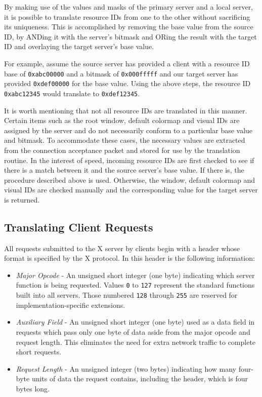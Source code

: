 By making use of the values and masks of the primary server and a local
server, it is possible to translate resource IDs from one to the other
without sacrificing its uniqueness.  This is accomplished by removing
the base value from the source ID, by ANDing it with the server's bitmask
and ORing the result with the target ID and overlaying the target
server's base value.

For example, assume the source server has provided a client with a
resource ID base of {\tt 0xabc00000} and a bitmask of {\tt 0x000fffff}
and our target server has provided  {\tt 0xdef00000} 
for the base value. Using the above steps,
the resource ID {\tt 0xabc12345} would translate to {\tt 0xdef12345}.

It is worth mentioning that not all resource IDs are translated in this
manner.  Certain items such as the root window, default colormap and
visual IDs are assigned by the server and do not necessarily conform to
a particular base value and bitmask.  To accommodate these cases, the
necessary values are extracted from the connection acceptance packet
and stored for use by the translation routine.  In the interest of
speed, incoming resource IDs are first checked to see if there is a
match between it and the source server's base value.  If there is, the
procedure described above is used.  Otherwise, the window, default
colormap and visual IDs are checked manually and the corresponding
value for the target server is returned.


\subsection{Translating Client Requests}

All requests submitted to the X server by clients begin with a header
whose format is specified by the X protocol.  In this header is the
following information:

\begin{itemize}

\item {\it Major Opcode} - An unsigned short integer (one byte)
indicating which server function is being requested.  Values {\tt 0}
to {\tt 127} represent the standard functions built into all servers.
Those numbered {\tt 128} through {\tt 255} are reserved for
implementation-specific extensions.


\item {\it Auxiliary Field} - An unsigned short integer (one byte) used
as a data field in requests which pass only one byte of data aside from
the major opcode and request length.  This eliminates the need for
extra network traffic to complete short requests.

\item {\it Request Length} - An unsigned integer (two bytes)
indicating how many four-byte units of data the request contains,
including the header, which is four bytes long.
\end{itemize}

